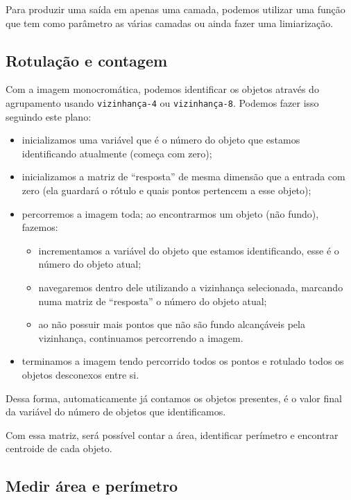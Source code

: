 \documentclass[brazilian,a4paper,twocolumn]{article}
\begin{document}
        Para produzir uma saída em apenas uma camada, podemos utilizar uma função que tem como parâmetro as várias camadas ou ainda fazer uma limiarização.

    \subsection{Rotulação e contagem}
    \label{sec:metodo-rotulacao}

        Com a imagem monocromática, podemos identificar os objetos através do agrupamento usando \texttt{vizinhança-4} ou \texttt{vizinhança-8}. Podemos fazer isso seguindo este plano:
        \begin{itemize}
            \item inicializamos uma variável que é o número do objeto que estamos identificando atualmente (começa com zero);
            \item inicializamos a matriz de ``resposta'' de mesma dimensão que a entrada com zero (ela guardará o rótulo e quais pontos pertencem a esse objeto);
            \item percorremos a imagem toda; ao encontrarmos um objeto (não fundo), fazemos:
            \begin{itemize}
                \item incrementamos a variável do objeto que estamos identificando, esse é o número do objeto atual;
                \item navegaremos dentro dele utilizando a vizinhança selecionada, marcando numa matriz de ``resposta'' o número do objeto atual;
                \item ao não possuir mais pontos que não são fundo alcançáveis pela vizinhança, continuamos percorrendo a imagem.
            \end{itemize}
            \item terminamos a imagem tendo percorrido todos os pontos e rotulado todos os objetos desconexos entre si.
        \end{itemize}

        Dessa forma, automaticamente já contamos os objetos presentes, é o valor final da variável do número de objetos que identificamos.

        Com essa matriz, será possível contar a área, identificar perímetro e encontrar centroide de cada objeto.

    \subsection{Medir área e perímetro}
\end{document}
